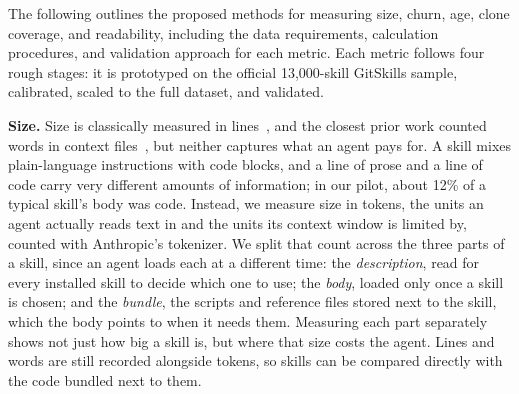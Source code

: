 \label{sec:design}


The following outlines the proposed methods for measuring size, churn, age, clone coverage, and readability, including the data requirements, calculation procedures, and validation approach for each metric.
Each metric follows four rough stages: it is prototyped on the official 13,000-skill GitSkills sample, calibrated, scaled to the full dataset, and validated.

\noindent\textbf{Size.}
Size is classically measured in lines~\cite[ch.~8]{fenton2014metrics}, and the closest prior work counted words in context files~\cite{chatlatanagulchai2026agent}, but neither captures what an agent pays for.
A skill mixes plain-language instructions with code blocks, and a line of prose and a line of code carry very different amounts of information; in our pilot, about 12\% of a typical skill's body was code.
Instead, we measure size in tokens, the units an agent actually reads text in and the units its context window is limited by, counted with Anthropic's tokenizer.
We split that count across the three parts of a skill, since an agent loads each at a different time: the \textit{description}, read for every installed skill to decide which one to use; the \textit{body}, loaded only once a skill is chosen; and the \textit{bundle}, the scripts and reference files stored next to the skill, which the body points to when it needs them.
Measuring each part separately shows not just how big a skill is, but where that size costs the agent.
Lines and words are still recorded alongside tokens, so skills can be compared directly with the code bundled next to them.\par


